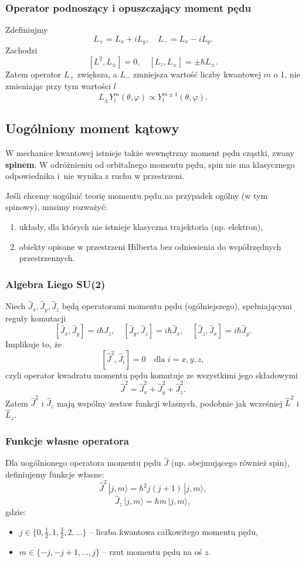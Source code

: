 \subsubsection*{Operator podnoszący i opuszczający moment pędu}
Zdefiniujmy
$$
L_+ = L_x + iL_y, \quad L_- = L_x - iL_y.
$$
Zachodzi
$$
[L^2, L_{\pm}] = 0, \quad [L_z, L_{\pm}] = \pm \hbar L_{\pm}.
$$
Zatem operator $L_+$ zwiększa, a $L_-$ zmniejsza wartość liczby kwantowej $m$ o 1, nie zmieniając przy tym wartości $l$
$$
L_{\pm} Y_l^m(\theta, \varphi) \propto Y_l^{m \pm 1}(\theta, \varphi).
$$

\subsection{Uogólniony moment kątowy}
W mechanice kwantowej istnieje także wewnętrzny moment pędu cząstki, zwany \textbf{spinem}. W odróżnieniu od orbitalnego momentu pędu, spin nie ma klasycznego odpowiednika i~nie wynika z ruchu w przestrzeni.

Jeśli chcemy uogólnić teorię momentu pędu na przypadek ogólny (w tym spinowy), musimy rozważyć:
\begin{enumerate}
\item układy, dla których nie istnieje klasyczna trajektoria (np. elektron),
\item obiekty opisane w przestrzeni Hilberta bez odniesienia do współrzędnych przestrzennych.
\end{enumerate}

\subsubsection*{Algebra Liego SU(2)}
Niech $\hat{J}_x, \hat{J}_y, \hat{J}_z$ będą operatorami momentu pędu (ogólniejszego), spełniającymi reguły komutacji
$$
[\hat{J}_x, \hat{J}_y] = i\hbar \hat{J}_z, \quad [\hat{J}_y, \hat{J}_z] = i\hbar \hat{J}_x, \quad [\hat{J}_z, \hat{J}_x] = i\hbar \hat{J}_y.
$$
Implikuje to, że
$$
[\hat{J}^2, \hat{J}_i] = 0 \quad \text{dla } i = x, y, z,
$$
czyli operator kwadratu momentu pędu komutuje ze wszystkimi jego składowymi
$$
\hat{J}^2 = \hat{J}_x^2 + \hat{J}_y^2 + \hat{J}_z^2.
$$
Zatem $\hat{J}^2$ i $\hat{J}_z$ mają wspólny zestaw funkcji własnych, podobnie jak wcześniej $\hat{L}^2$ i $\hat{L}_z$.

\subsubsection*{Funkcje własne operatora}
Dla uogólnionego operatora momentu pędu $\hat{J}$ (np. obejmującego również spin), definiujemy funkcje własne:
$$
\hat{J}^2 \, |j, m\rangle = \hbar^2 j(j+1) \, |j, m\rangle,
$$
$$
\hat{J}_z \, |j, m\rangle = \hbar m \, |j, m\rangle,
$$
gdzie:
\begin{itemize}
\item $j \in \{0, \tfrac{1}{2}, 1, \tfrac{3}{2}, 2, \dots \}$ -- liczba kwantowa całkowitego momentu pędu,
\item $m \in \{-j, -j+1, \dots, j\}$ -- rzut momentu pędu na oś $z$.
\end{itemize}
